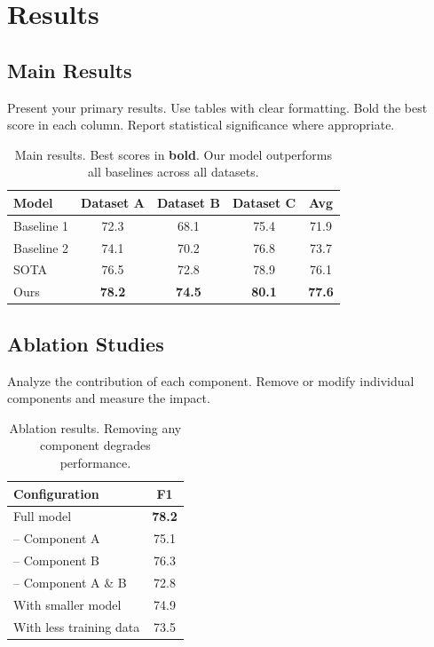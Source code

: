 \documentclass[11pt,a4paper]{article}
\begin{document}
\section{Results}

\subsection{Main Results}

Present your primary results. Use tables with clear formatting. Bold the best 
score in each column. Report statistical significance where appropriate.

\begin{table}[t]
  \centering
  \begin{tabular}{@{}lcccc@{}}
    \toprule
    \textbf{Model} & \textbf{Dataset A} & \textbf{Dataset B} & 
    \textbf{Dataset C} & \textbf{Avg} \\
    \midrule
    Baseline 1 & 72.3 & 68.1 & 75.4 & 71.9 \\
    Baseline 2 & 74.1 & 70.2 & 76.8 & 73.7 \\
    SOTA       & 76.5 & 72.8 & 78.9 & 76.1 \\
    \midrule
    Ours       & \textbf{78.2} & \textbf{74.5} & \textbf{80.1} & 
    \textbf{77.6} \\
    \bottomrule
  \end{tabular}
  \caption{Main results. Best scores in \textbf{bold}. 
    Our model outperforms all baselines across all datasets.}
  \label{tab:main-results}
\end{table}

\subsection{Ablation Studies}

Analyze the contribution of each component. Remove or modify individual 
components and measure the impact.

\begin{table}[t]
  \centering
  \begin{tabular}{@{}lc@{}}
    \toprule
    \textbf{Configuration} & \textbf{F1} \\
    \midrule
    Full model              & \textbf{78.2} \\
    -- Component A          & 75.1 \\
    -- Component B          & 76.3 \\
    -- Component A \& B     & 72.8 \\
    With smaller model      & 74.9 \\
    With less training data & 73.5 \\
    \bottomrule
  \end{tabular}
  \caption{Ablation results. Removing any component degrades performance.}
  \label{tab:ablations}
\end{table}
\end{document}
